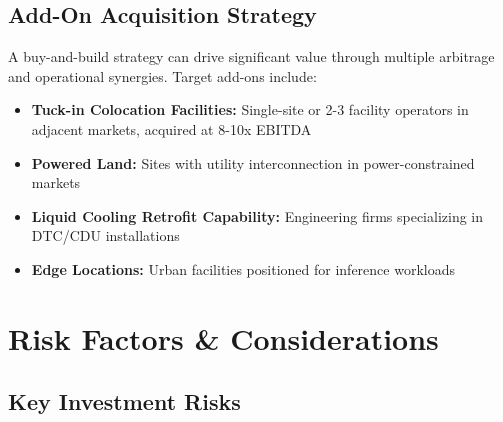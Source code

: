 \documentclass[11pt,a4paper]{article}
\begin{document}
\subsection{Add-On Acquisition Strategy}

A buy-and-build strategy can drive significant value through multiple arbitrage and operational synergies. Target add-ons include:

\begin{itemize}[leftmargin=*, itemsep=4pt]
    \item \textbf{Tuck-in Colocation Facilities:} Single-site or 2-3 facility operators in adjacent markets, acquired at 8-10x EBITDA
    \item \textbf{Powered Land:} Sites with utility interconnection in power-constrained markets
    \item \textbf{Liquid Cooling Retrofit Capability:} Engineering firms specializing in DTC/CDU installations
    \item \textbf{Edge Locations:} Urban facilities positioned for inference workloads
\end{itemize}

\newpage

\section{Risk Factors \& Considerations}

\subsection{Key Investment Risks}
\end{document}
